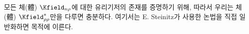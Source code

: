 
모든 체(體) $\Kfield_{n\rho}$에 대한 유리기저의 존재를 증명하기 위해, 따라서 우리는 체(體) $\Kfield^*_{\rho\rho}$만을 다루면 충분하다. 여기서는 E. Steinitz가 사용한 논법을 직접 일반화하면 목적에 이른다.
